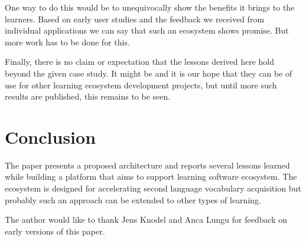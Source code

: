\documentclass{sig-alternate-05-2015}
\begin{document}
One way to do this would be to unequivocally show 
the benefits it brings to the learners. Based on 
early user studies and the feedback we received 
from individual applications we can say that such
an ecosystem shows promise. But more work has to 
be done for this. 


Finally, there is no claim or expectation that the 
lessons derived here hold beyond the given case study. It 
might be and it is our hope that they can be of 
use for other learning ecosystem development
projects, but until more such results 
are published, this remains to be seen.







\section{Conclusion}

The paper presents a proposed architecture and reports
several lessons learned while building a platform that
aims to support learning software ecosystem. 
The ecosystem is designed for accelerating second language
vocabulary acquisition but probably such an approach can 
be extended to other types of learning. 

\vspace{0.5cm} 
 The author would like to thank
Jens Knodel and Anca Lungu for feedback on early versions 
of this paper. 

\newpage



\end{document}
